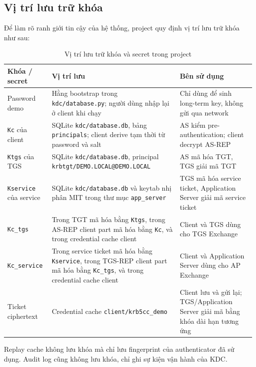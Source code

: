 \documentclass[12pt]{article}
\begin{document}
\subsection{Vị trí lưu trữ khóa}

Để làm rõ ranh giới tin cậy của hệ thống, project quy định vị trí lưu trữ khóa như sau:

\begin{table}[H]
\centering
\renewcommand{\arraystretch}{1.25}
\begin{tabularx}{\textwidth}{|p{4cm}|p{6cm}|X|}
\hline
\textbf{Khóa / secret} & \textbf{Vị trí lưu} & \textbf{Bên sử dụng} \\
\hline
Password demo & Hằng bootstrap trong \texttt{kdc/database.py}; người dùng nhập lại ở client khi chạy & Chỉ dùng để sinh long-term key, không gửi qua network \\
\hline
\texttt{Kc} của client & SQLite \texttt{kdc/database.db}, bảng \texttt{principals}; client derive tạm thời từ password và salt & AS kiểm pre-authentication; client decrypt AS-REP \\
\hline
\texttt{Ktgs} của TGS & SQLite \texttt{kdc/database.db}, principal \texttt{krbtgt/DEMO.LOCAL@DEMO.LOCAL} & AS mã hóa TGT, TGS giải mã TGT \\
\hline
\texttt{Kservice} của service & SQLite \texttt{kdc/database.db} và keytab nhị phân MIT trong thư mục \texttt{app\_server} & TGS mã hóa service ticket, Application Server giải mã service ticket \\
\hline
\texttt{Kc\_tgs} & Trong TGT mã hóa bằng \texttt{Ktgs}, trong AS-REP client part mã hóa bằng \texttt{Kc}, và trong credential cache client & Client và TGS dùng cho TGS Exchange \\
\hline
\texttt{Kc\_service} & Trong service ticket mã hóa bằng \texttt{Kservice}, trong TGS-REP client part mã hóa bằng \texttt{Kc\_tgs}, và trong credential cache client & Client và Application Server dùng cho AP Exchange \\
\hline
Ticket ciphertext & Credential cache \texttt{client/krb5cc\_demo} & Client lưu và gửi lại; TGS/Application Server giải mã bằng khóa dài hạn tương ứng \\
\hline
\end{tabularx}
\caption{Vị trí lưu trữ khóa và secret trong project}
\end{table}

Replay cache không lưu khóa mà chỉ lưu fingerprint của authenticator đã sử dụng. Audit log cũng không lưu khóa, chỉ ghi sự kiện vận hành của KDC.
\end{document}
